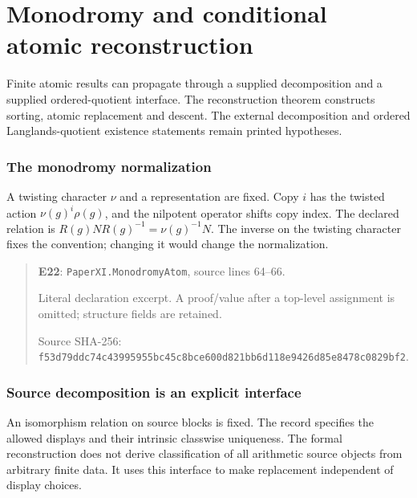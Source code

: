 \documentclass[10pt,oneside]{book}
\begin{document}

\chapter{Monodromy and conditional atomic reconstruction}
Finite atomic results can propagate through a supplied decomposition and a supplied ordered-quotient interface. The reconstruction theorem constructs sorting, atomic replacement and descent. The external decomposition and ordered Langlands-quotient existence statements remain printed hypotheses.

\subsection{The monodromy normalization}
\label{guide:E22}
A twisting character \(\nu\) and a representation are fixed. Copy \(i\) has the twisted action \(\nu(g)^i\rho(g)\), and the nilpotent operator shifts copy index.
The declared relation is \(R(g)NR(g)^{-1}=\nu(g)^{-1}N\). The inverse on the twisting character fixes the convention; changing it would change the normalization.

\begin{quote}\footnotesize\textbf{E22}: \nolinkurl{PaperXI.MonodromyAtom}, source lines 64--66.\par Literal declaration excerpt. A proof/value after a top-level assignment is omitted; structure fields are retained.\par Source SHA-256: {\scriptsize\texttt{f53d79ddc74c43995955bc45c8bce600d821bb6d118e9426d85e8478c0829bf2}}.\end{quote}


\subsection{Source decomposition is an explicit interface}
\label{guide:E23}
An isomorphism relation on source blocks is fixed. The record specifies the allowed displays and their intrinsic classwise uniqueness.
The formal reconstruction does not derive classification of all arithmetic source objects from arbitrary finite data. It uses this interface to make replacement independent of display choices.
\end{document}
